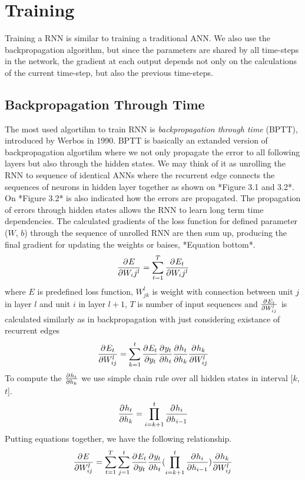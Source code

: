 \section{Training}

Training a RNN is similar to training a traditional ANN.
We also use the backpropagation algorithm, but since the parameters are shared by all time-steps in the network, the gradient at each output depends not only on the calculations of the current time-step, but also the previous time-steps.






\subsection{Backpropagation Through Time}

The most used algortihm to train RNN is \textit{backpropagation through time} (BPTT), introduced by Werbos in 1990.
BPTT is basically an extanded version of backpropagation algortihm where we not only propagate the error to all following layers but also through the hidden states.
We may think of it as unrolling the RNN to sequence of identical ANNs where the recurrent edge connects the sequences of neurons in hidden layer together as shown on *Figure 3.1 and 3.2*.
On *Figure 3.2* is also indicated how the errors are propagated.
The propagation of errors through hidden states allows the RNN to learn long term time dependencies.
The calculated gradients of the loss function for defined parameter ($W$, $b$) through the sequence of unrolled RNN are then sum up, producing the final gradient for updating the weights or baises, *Equation bottom*.
\[ \frac{\partial^{} E}{\partial W_ij^l} = \sum_{t=1}^{T}\frac{\partial^{} E_t}{\partial W_ij^l} \]
where $E$ is predefined loss function, ${W_{jk}^l}$ is weight with connection between unit $j$ in layer $l$ and unit $i$ in layer $l+1$, $T$ is number of input sequences and $\frac{\partial^{} E_t}{\partial W_{ij}^l}$ is calculated similarly as in backpropagation with just considering existance of recurrent edges
\[ \frac{\partial^{} E_t}{\partial W_{ij}^l} = \sum_{k=1}^{t}\frac{\partial^{} E_t}{\partial y_t}\frac{\partial^{} y_t}{\partial h_t}\frac{\partial^{} h_t}{\partial h_k}\frac{\partial^{} h_k}{\partial W_{ij}^l} \]
To compute the $\frac{\partial^{} h_t}{\partial h_k}$ we use simple chain rule over all hidden states in interval [$k$,$t$].
\[ \frac{\partial^{} h_t}{\partial h_k} = \prod_{i=k+1}^{t}\frac{\partial^{} h_i}{\partial h_{i-1}} \]
Putting equations together, we have the following relationship.
\[  \frac{\partial^{} E}{\partial W_{ij}^l} = \sum_{t=1}^{T}\sum_{j=1}^{t}\frac{\partial^{} E_t}{\partial y_t}\frac{\partial^{} y_t}{\partial h_t}(\prod_{i=k+1}^{t}\frac{\partial^{} h_i}{\partial h_{i-1}})\frac{\partial^{} h_k}{\partial W_{ij}^l} \]

